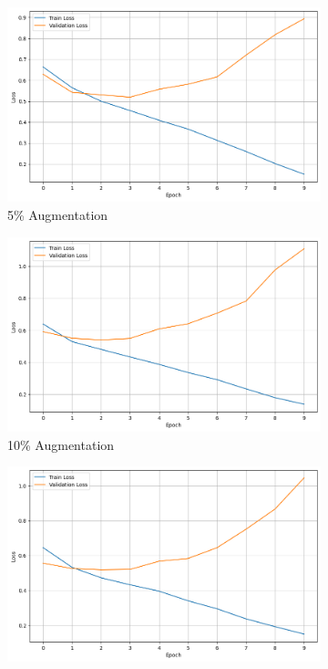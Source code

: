 \documentclass{article}
\begin{document}
\begin{figure}[ht]
  \centering
  \begin{subfigure}[b]{0.3\textwidth}
    \includegraphics[width=\textwidth]{img/llm_loss_5.png}
    \caption{5\% Augmentation}
    \label{fig:llm_loss_5}
  \end{subfigure}
  \hfill
  \begin{subfigure}[b]{0.3\textwidth}
    \includegraphics[width=\textwidth]{img/llm_loss_10.png}
    \caption{10\% Augmentation}
    \label{fig:llm_loss_10}
  \end{subfigure}
  \hfill
  \begin{subfigure}[b]{0.3\textwidth}
    \includegraphics[width=\textwidth]{img/llm_loss_20.png}

\end{subfigure}
\end{figure}
\end{document}
